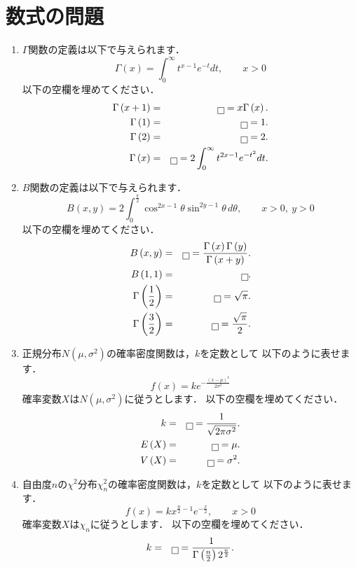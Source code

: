 \documentclass[12pt]{ltjsarticle}
\begin{document}
\section{数式の問題}
\begin{enumerate}
\item
$\Gamma$関数の定義は以下で与えられます．
\[
\Gamma\left(x\right)=\int_0^\infty t^{x-1}e^{-t}dt,\qquad
x>0
\]
以下の空欄を埋めてください．
\begin{eqnarray*}
\Gamma\left(x+1\right)&=&\fbox{}
=x\Gamma\left(x\right). \\
\Gamma\left(1\right)&=&\fbox{}=1. \\
\Gamma\left(2\right)&=&\fbox{}=2. \\
\Gamma\left(x\right)&=&\fbox{}=2\int_0^\infty t^{2x-1}e^{-t^2}dt.
\end{eqnarray*}
\item
$B$関数の定義は以下で与えられます．
\[
B\left(x,y\right)=2\int_0^\frac{\pi}{2}
\cos^{2x-1}\theta\sin^{2y-1}\theta\,d\theta,\qquad
x>0,\ y>0
\]
以下の空欄を埋めてください．
\begin{eqnarray*}
B\left(x,y\right)&=&\fbox{}=
\frac{\Gamma\left(x\right)\Gamma\left(y\right)}{\Gamma\left(x+y\right)}. \\
B\left(1,1\right)&=&\fbox{}. \\
\Gamma\left(\frac{1}{2}\right)&=&\fbox{}=\sqrt{\pi}. \\
\Gamma\left(\frac{3}{2}\right)&=&\fbox{}=\frac{\sqrt{\pi}}{2}. \\
\end{eqnarray*}
\item
正規分布$N\left(\mu,\sigma^2\right)$の確率密度関数は，$k$を定数として
以下のように表せます．
\[
f\left(x\right)=ke^{-\frac{\left(x-\mu\right)^2}{2\sigma^2}}
\]
確率変数$X$は$N\left(\mu,\sigma^2\right)$に従うとします．
以下の空欄を埋めてください．
\begin{eqnarray*}
k&=&\fbox{}=\frac{1}{\sqrt{2\pi\sigma^2}}. \\
E\left(X\right)&=&\fbox{}=\mu. \\
V\left(X\right)&=&\fbox{}=\sigma^2.
\end{eqnarray*}
\item
自由度$n$の$\chi^2$分布$\chi_n^2$の確率密度関数は，$k$を定数として
以下のように表せます．
\[
f\left(x\right)=kx^{\frac{n}{2}-1}e^{-\frac{x}{2}},\qquad
x>0
\]
確率変数$X$は$\chi_n$に従うとします．
以下の空欄を埋めてください．
\begin{eqnarray*}
k&=&\fbox{}=\frac{1}{\Gamma\left(\frac{n}{2}\right)2^{\frac{n}{2}}}. \\

\end{eqnarray*}
\end{enumerate}
\end{document}
